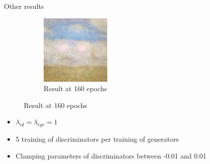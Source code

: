 \documentclass[12pt]{beamer}
\begin{document}
    \begin{frame}{Other results}
        \begin{minipage}{0.5\textwidth}
            \begin{figure}[H]
                \begin{subfigure}[b]{\textwidth}
                    \centering
                    \includegraphics[width=\textwidth]{resources/cycle-gan/main6.png}
                    \caption{Result at 160 epochs}
                \end{subfigure}
            \end{figure}
        \end{minipage}
        \hfill
        \begin{minipage}{0.45\textwidth}
            \begin{itemize}
                \item $\lambda_{id} = \lambda_{cyc} = 1$
                \item 5 training of discriminators per training of generators
                \item Clamping parameters of discriminators between -0.01 and 0.01
            \end{itemize}
        \end{minipage}
    \end{frame}
\end{document}
